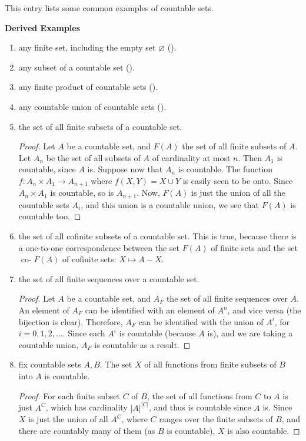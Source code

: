 \documentclass[12pt]{article}
\begin{document}
This entry lists some common examples of countable sets.

\textbf{Derived Examples}
\begin{enumerate}
\item any finite set, including the empty set $\varnothing$ ().
\item any subset of a countable set ().
\item any finite product of countable sets ().
\item any countable union of countable sets ().
\item the set of all finite subsets of a countable set.
\begin{proof}  Let $A$ be a countable set, and $F(A)$ the set of all finite subsets of $A$.  Let $A_n$ be the set of all subsets of $A$ of cardinality at most $n$.  Then $A_1$ is countable, since $A$ is.  Suppose now that $A_n$ is countable.  The function $f: A_n \times A_1 \to A_{n+1}$ where $f(X,Y)=X\cup Y$ is easily seen to be onto.  Since $A_n\times A_1$ is countable, so is $A_{n+1}$.  Now, $F(A)$ is just the union of all the countable sets $A_i$, and this union is a countable union, we see that $F(A)$ is countable too.
\end{proof}
\item the set of all cofinite subsets of a countable set.  This is true, because there is a one-to-one correspondence between the set $F(A)$ of finite sets and the set $\operatorname{co-}F(A)$ of cofinite sets: $X\mapsto A-X$.
\item the set of all finite sequences over a countable set.
\begin{proof}
Let $A$ be a countable set, and $A_F$ the set of all finite sequences over $A$.  An element of $A_F$ can be identified with an element of $A^n$, and vice versa (the bijection is clear).  Therefore, $A_F$ can be identified with the union of $A^i$, for $i=0,1,2,\ldots$.  Since each $A^i$ is countable (because $A$ is), and we are taking a countable union, $A_F$ is countable as a result.
\end{proof}
\item fix countable sets $A,B$.  The set $X$ of all functions from finite subsets of $B$ into $A$ is countable.
\begin{proof}
For each finite subset $C$ of $B$, the set of all functions from $C$ to $A$ is just $A^C$, which has cardinality $|A|^{|C|}$, and thus is countable since $A$ is. Since $X$ is just the union of all $A^C$, where $C$ ranges over the finite subsets of $B$, and there are countably many of them (as $B$ is countable), $X$ is also countable.

\end{proof}
\end{enumerate}
\end{document}
